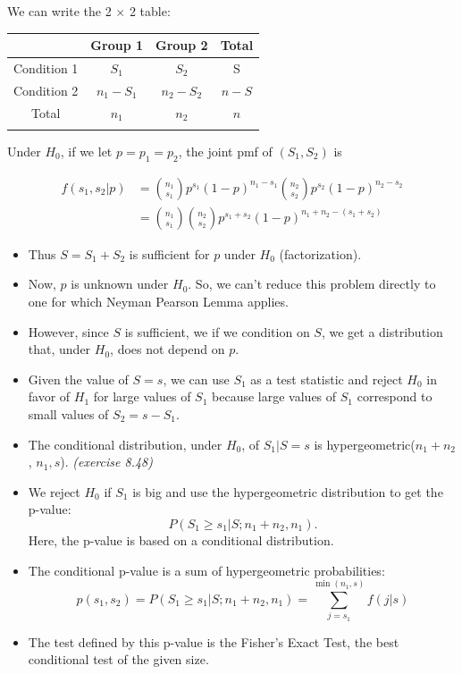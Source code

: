 \documentclass[11pt,]{article}
\begin{document}
We can write the 2 \(\times\) 2 table:

\begin{tabular}{c|c|c||c}\hline & Group 1 & Group 2 &  Total \\\hline 
Condition 1 &  $S_1$ & $S_2$ & S \\\hline 
Condition 2 & $n_1 - S_1$ & $n_2 - S_2$ & $n-S$ \\\hline \hline
Total & $n_1$ & $n_2$ & $n$ \\\hline\\ \end{tabular}

Under \(H_0\), if we let \(p = p_1 = p_2\), the joint pmf of
\((S_1, S_2)\) is

\begin{align*}
f(s_1, s_2 | p) &= {n_1 \choose s_1} p^{s_1}(1-p)^{n_1 - s_1} {n_2 \choose s_2} p^{s_2}(1-p)^{n_2 - s_2}\\
&= {n_1 \choose s_1} {n_2 \choose s_2} p^{s_1 + s_2} (1-p)^{n_1 + n_2 - (s_1 + s_2)}
\end{align*}

\begin{itemize}
\item Thus $S = S_1 + S_2$ is sufficient for $p$ under $H_0$ (factorization).
\item Now, $p$ is unknown under $H_0$. So, we can't reduce this problem directly to one for which Neyman Pearson Lemma applies.
\item However, since $S$ is sufficient, we if we condition on $S$, we get a distribution that, under $H_0$, does not depend on $p$.
\item Given the value of $S = s$, we can use $S_1$ as a test statistic and reject $H_0$ in favor of $H_1$ for large values of $S_1$ because large values of $S_1$ correspond to small values of $S_2 = s - S_1$.
\item The conditional distribution, under $H_0$, of $S_1 | S = s$ is hypergeometric($n_1 + n_2$, $n_1, s$). {\em(exercise 8.48)}
\item We reject $H_0$ if $S_1$ is big and use the hypergeometric distribution to get the p-value: $$P(S_1 \geq s_1 | S; n_1 + n_2, n_1).$$ Here, the p-value is based on a conditional distribution.
\item The conditional p-value is a sum of hypergeometric probabilities:
$$p(s_1, s_2) = P(S_1 \geq s_1 | S; n_1 + n_2, n_1) = \sum_{j=s_1}^{\min(n_1,s)} f(j|s)$$
\item The test defined by this p-value is the Fisher's Exact Test, the best conditional test of the given size.
\end{itemize}
\end{document}

